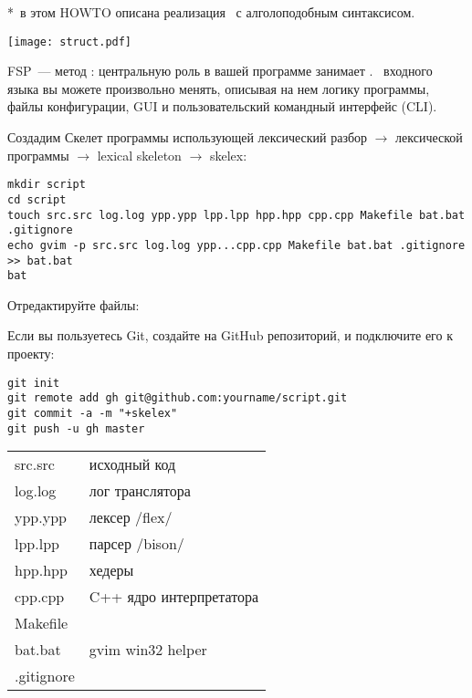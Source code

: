*\ в этом HOWTO описана реализация \ с
алголоподобным синтаксисом.


\texttt{[image: struct.pdf]}


FSP\ --- метод : центральную роль в вашей программе занимает
.
\ входного языка вы можете произвольно менять,
описывая на нем логику программы, файлы конфигурации, GUI и пользовательский
командный интерфейс (CLI).


Создадим Скелет программы использующей лексический разбор $\rightarrow$
лексической программы $\rightarrow$ lexical skeleton $\rightarrow$ skelex:

\begin{verbatim}
mkdir script
cd script
touch src.src log.log ypp.ypp lpp.lpp hpp.hpp cpp.cpp Makefile bat.bat .gitignore
echo gvim -p src.src log.log ypp...cpp.cpp Makefile bat.bat .gitignore >> bat.bat
bat
\end{verbatim}

Отредактируйте файлы:


\bigskip
Если вы пользуетесь Git, создайте на GitHub репозиторий, и подключите его к
проекту:
\begin{verbatim}
git init
git remote add gh git@github.com:yourname/script.git
git commit -a -m "+skelex"
git push -u gh master
\end{verbatim}

\begin{tabular}{l l}
	src.src & исходный код \\
	log.log & лог транслятора \\
	\hline
	ypp.ypp & лексер /flex/ \\
	lpp.lpp & парсер /bison/ \\
	hpp.hpp & хедеры \\
	cpp.cpp & C++ ядро интерпретатора \\
	Makefile & \\
	\hline
	bat.bat & gvim win32 helper \\
	.gitignore & \\
\end{tabular}

